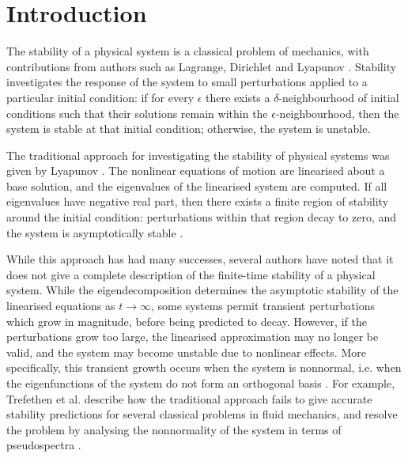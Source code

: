 \documentclass{siamltex}
\begin{document}
  \pagestyle{myheadings}
  \thispagestyle{plain}

  \setcounter{section}{0}
  \setcounter{equation}{0}

\section{Introduction}

The stability of a physical system is a classical problem
of mechanics, with contributions from authors such as Lagrange,
Dirichlet and Lyapunov \cite{leine2010}. Stability investigates 
the response of the system to small perturbations
applied to a particular initial condition: if for every $\epsilon$ there exists a $\delta$-neighbourhood of initial conditions
such that their solutions remain within the $\epsilon$-neighbourhood, then the system is stable at that initial condition; otherwise,
the system is unstable.

The traditional approach for investigating the stability of physical
systems was given by Lyapunov \cite{lyapunov1892}. The nonlinear
equations of motion are linearised about a base solution, and the eigenvalues
of the linearised system are computed. If all eigenvalues have negative real
part, then there exists a finite region of stability around the initial condition:
perturbations within that region decay to zero, and the system is asymptotically
stable \cite{parks1992}.

While this approach has had many successes, several authors have noted that
it does not give a complete description of the finite-time stability of a physical
system. While the eigendecomposition determines the asymptotic stability of the linearised equations as
$t \rightarrow \infty$, some systems permit transient perturbations which
grow in magnitude, before being predicted to decay. However, if the perturbations
grow too large, the linearised approximation may no longer be valid, and the system may become
unstable due to nonlinear effects. More specifically, this transient growth occurs when the system is nonnormal,
i.e. when the eigenfunctions of the system do not form an orthogonal basis \cite{schmid2007}.
For example, Trefethen et al. \cite{trefethen1993} describe how
the traditional approach fails to give accurate stability predictions
for several classical problems in fluid mechanics, and resolve the problem
by analysing the nonnormality of the system in terms of pseudospectra \cite{trefethen2006}.
\end{document}
